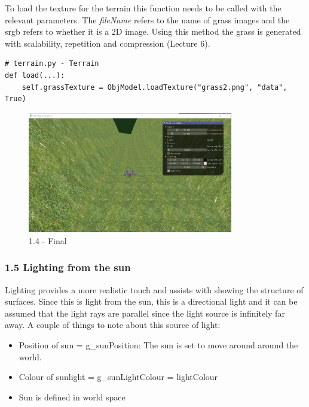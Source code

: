 \documentclass[a4 paper, 12pt]{article}
\begin{document}
To load the texture for the terrain this function needs to be called with the relevant parameters. The \textit{fileName} refers to the name of grass images and the srgb refers to whether it is a 2D image. Using this method the grass is generated with scalability, repetition and compression (Lecture 6).
    \begin{lstlisting}  
# terrain.py - Terrain
def load(...):
    self.grassTexture = ObjModel.loadTexture("grass2.png", "data", True)
    \end{lstlisting}

\begin{figure} [H]
    \centering
    \includegraphics[width=0.8\textwidth, frame]
        {./images/mega_racer/1.4.PNG}
    \caption{1.4 - Final}
\end{figure}


\subsubsection{1.5 Lighting from the sun}  
Lighting provides a more realistic touch and assists with showing the structure of surfaces. Since this is light from the sun, this is a directional light and it can be assumed that the light rays are parallel since the light source is infinitely far away. A couple of things to note about this source of light:
\begin{itemize}
    \item Position of sun = g\_sunPosition: The sun is set to move around around the world.
    \item Colour of sunlight = g\_sunLightColour = lightColour
    \item Sun is defined in world space
\end{itemize}
\end{document}
